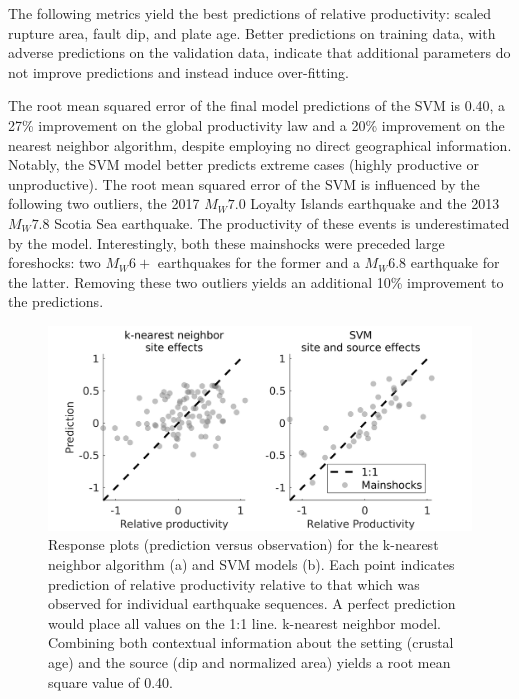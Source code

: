 \documentclass[draft, jgrga]{agujournal2018}
\begin{document}
    The following metrics yield the best predictions of relative productivity: scaled rupture area, fault dip, and plate age. Better predictions on training data, with adverse predictions on the validation data, indicate that additional parameters do not improve predictions and instead induce over-fitting.

    The root mean squared error of the final model predictions of the SVM is 0.40, a 27\% improvement on the global productivity law and a 20\% improvement on the nearest neighbor algorithm, despite employing no direct geographical information. Notably, the SVM model better predicts extreme cases (highly productive or unproductive). The root mean squared error of the SVM is influenced by the following two outliers, the 2017 $M_W7.0$ Loyalty Islands earthquake and the 2013 $M_W7.8$ Scotia Sea earthquake. The productivity of these events is underestimated by the model. Interestingly, both these mainshocks were preceded large foreshocks: two $M_W6+$ earthquakes for the former and a $M_W6.8$ earthquake for the latter. Removing these two outliers yields an additional 10\% improvement to the predictions.

    \begin{figure}
        \centering
        \includegraphics{response.png}
        \caption{Response plots (prediction versus observation) for the k-nearest neighbor algorithm (a) and SVM models (b). Each point indicates prediction of relative productivity relative to that which was observed for individual earthquake sequences. A perfect prediction would place all values on the 1:1 line.  k-nearest neighbor model. Combining both contextual information about the setting (crustal age) and the source (dip and normalized area) yields a root mean square value of 0.40.}
        \label{fig:response}
    \end{figure}
\end{document}
